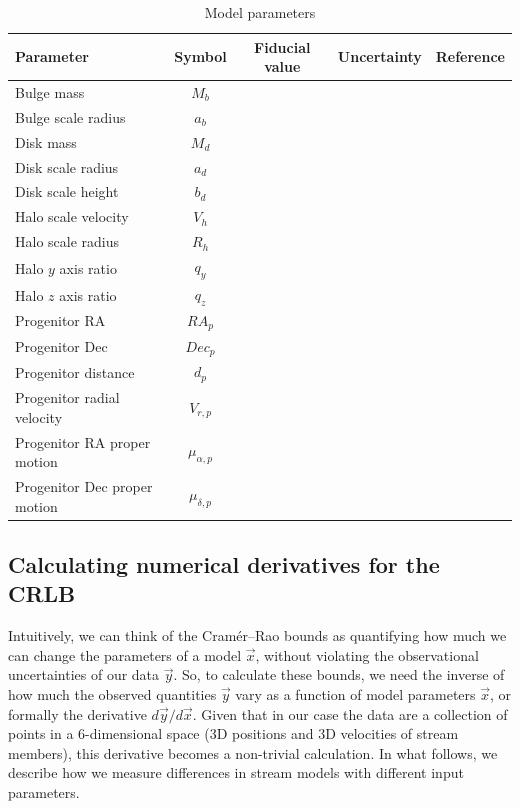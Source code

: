 \documentclass[modern]{aastex61}
\newcommand{\acronym}[1]{{\small{#1}}}
\newcommand{\CRLB}{\acronym{CRLB}}
\begin{document}
\begin{center}
\begin{table}
\begin{tabular}{l c c c l}
\hline
\hline
Parameter & Symbol & Fiducial value & Uncertainty & Reference \\
\hline
\hline
Bulge mass & $M_b$ & & & \\
Bulge scale radius & $a_b$ & & & \\
Disk mass & $M_d$ & & & \\
Disk scale radius & $a_d$ & & & \\
Disk scale height & $b_d$ & & & \\
\hline
Halo scale velocity & $V_h$ & & & \\
Halo scale radius & $R_h$ & & & \\
Halo $y$ axis ratio & $q_y$ & & & \\
Halo $z$ axis ratio & $q_z$ & & & \\
\hline
Progenitor RA & $RA_p$ & & & \\
Progenitor Dec & $Dec_p$ & & & \\
Progenitor distance & $d_p$ & & & \\
Progenitor radial velocity & $V_{r,p}$ & & & \\
Progenitor RA proper motion & $\mu_{\alpha,p}$ & & & \\
Progenitor Dec proper motion & $\mu_{\delta,p}$ & & & \\
\hline
\hline
\end{tabular}
\caption{Model parameters}
\label{t:model}
\end{table}
\end{center}

\subsection{Calculating numerical derivatives for the \CRLB}
\label{sec:derivatives}
Intuitively, we can think of the Cram\'er--Rao bounds as quantifying how much we can change the parameters of a model $\vec{x}$, without violating the observational uncertainties of our data $\vec{y}$.
So, to calculate these bounds, we need the inverse of how much the observed quantities $\vec{y}$ vary as a function of model parameters $\vec{x}$, or formally the derivative $d\vec{y}/d\vec{x}$.
Given that in our case the data are a collection of points in a 6-dimensional space (3D positions and 3D velocities of stream members), this derivative becomes a non-trivial calculation.
In what follows, we describe how we measure differences in stream models with different input parameters.
\end{document}
